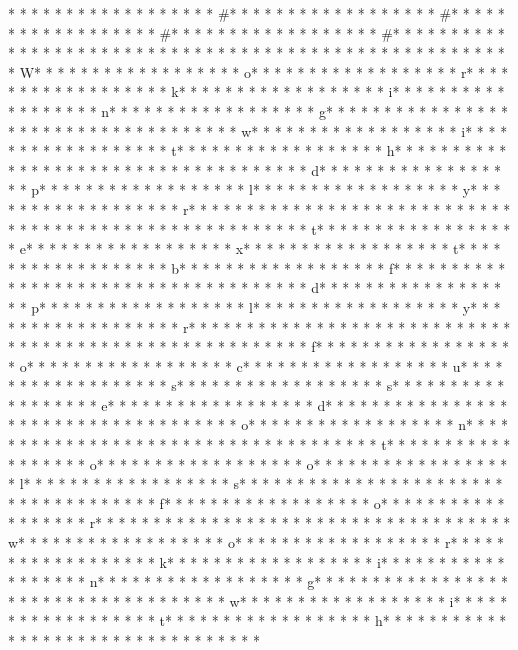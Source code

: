 * * *  * * *  * * *  *  * * *  *  * * *  * #* * *  * * *  * * *  *  * * *  *  * * *  * #* * *  * * *  * * *  *  * * *  *  * * *  * #* * *  * * *  * * *  *  * * *  *  * * *  * #* * *  * * *  * * *  *  * * *  *  * * *  *  * * *  * * *  * * *  *  * * *  *  * * *  * {* * *  * * *  * * *  *  * * *  *  * * *  * W* * *  * * *  * * *  *  * * *  *  * * *  * o* * *  * * *  * * *  *  * * *  *  * * *  * r* * *  * * *  * * *  *  * * *  *  * * *  * k* * *  * * *  * * *  *  * * *  *  * * *  * i* * *  * * *  * * *  *  * * *  *  * * *  * n* * *  * * *  * * *  *  * * *  *  * * *  * g* * *  * * *  * * *  *  * * *  *  * * *  *  * * *  * * *  * * *  *  * * *  *  * * *  * w* * *  * * *  * * *  *  * * *  *  * * *  * i* * *  * * *  * * *  *  * * *  *  * * *  * t* * *  * * *  * * *  *  * * *  *  * * *  * h* * *  * * *  * * *  *  * * *  *  * * *  *  * * *  * * *  * * *  *  * * *  *  * * *  * d* * *  * * *  * * *  *  * * *  *  * * *  * p* * *  * * *  * * *  *  * * *  *  * * *  * l* * *  * * *  * * *  *  * * *  *  * * *  * y* * *  * * *  * * *  *  * * *  *  * * *  * r* * *  * * *  * * *  *  * * *  *  * * *  * }* * *  * * *  * * *  *  * * *  *  * * *  *  * * *  * * *  * * *  *  * * *  *  * * *  * t* * *  * * *  * * *  *  * * *  *  * * *  * e* * *  * * *  * * *  *  * * *  *  * * *  * x* * *  * * *  * * *  *  * * *  *  * * *  * t* * *  * * *  * * *  *  * * *  *  * * *  * b* * *  * * *  * * *  *  * * *  *  * * *  * f* * *  * * *  * * *  *  * * *  *  * * *  * {* * *  * * *  * * *  *  * * *  *  * * *  * d* * *  * * *  * * *  *  * * *  *  * * *  * p* * *  * * *  * * *  *  * * *  *  * * *  * l* * *  * * *  * * *  *  * * *  *  * * *  * y* * *  * * *  * * *  *  * * *  *  * * *  * r* * *  * * *  * * *  *  * * *  *  * * *  * }* * *  * * *  * * *  *  * * *  *  * * *  *  * * *  * * *  * * *  *  * * *  *  * * *  * f* * *  * * *  * * *  *  * * *  *  * * *  * o* * *  * * *  * * *  *  * * *  *  * * *  * c* * *  * * *  * * *  *  * * *  *  * * *  * u* * *  * * *  * * *  *  * * *  *  * * *  * s* * *  * * *  * * *  *  * * *  *  * * *  * s* * *  * * *  * * *  *  * * *  *  * * *  * e* * *  * * *  * * *  *  * * *  *  * * *  * d* * *  * * *  * * *  *  * * *  *  * * *  *  * * *  * * *  * * *  *  * * *  *  * * *  * o* * *  * * *  * * *  *  * * *  *  * * *  * n* * *  * * *  * * *  *  * * *  *  * * *  *  * * *  * * *  * * *  *  * * *  *  * * *  * t* * *  * * *  * * *  *  * * *  *  * * *  * o* * *  * * *  * * *  *  * * *  *  * * *  * o* * *  * * *  * * *  *  * * *  *  * * *  * l* * *  * * *  * * *  *  * * *  *  * * *  * s* * *  * * *  * * *  *  * * *  *  * * *  *  * * *  * * *  * * *  *  * * *  *  * * *  * f* * *  * * *  * * *  *  * * *  *  * * *  * o* * *  * * *  * * *  *  * * *  *  * * *  * r* * *  * * *  * * *  *  * * *  *  * * *  *  * * *  * * *  * * *  *  * * *  *  * * *  * w* * *  * * *  * * *  *  * * *  *  * * *  * o* * *  * * *  * * *  *  * * *  *  * * *  * r* * *  * * *  * * *  *  * * *  *  * * *  * k* * *  * * *  * * *  *  * * *  *  * * *  * i* * *  * * *  * * *  *  * * *  *  * * *  * n* * *  * * *  * * *  *  * * *  *  * * *  * g* * *  * * *  * * *  *  * * *  *  * * *  *  * * *  * * *  * * *  *  * * *  *  * * *  * w* * *  * * *  * * *  *  * * *  *  * * *  * i* * *  * * *  * * *  *  * * *  *  * * *  * t* * *  * * *  * * *  *  * * *  *  * * *  * h* * *  * * *  * * *  *  * * *  *  * * *  *  * * *  * * *  * * *  *  * * *  *  * 